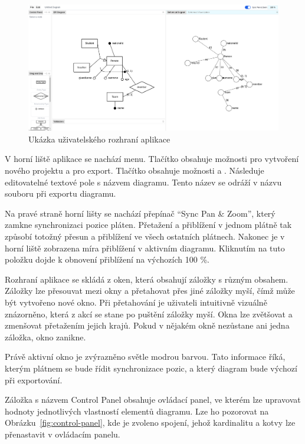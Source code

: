 \begin{figure}[!htb]
  \centering
  \includegraphics[width=\maxwidth{\textwidth}]{../img/app/user-interface.png}
  \caption{Ukázka uživatelského rozhraní aplikace}
  \label{fig:user-interface}
\end{figure}

V horní liště aplikace se nachází menu.
Tlačítko  obsahuje možnosti pro vytvoření nového projektu a pro export.
Tlačítko  obsahuje možnosti  a .
Následuje editovatelné textové pole s názvem diagramu.
Tento název se odráží v názvu souboru při exportu diagramu.

Na pravé straně horní lišty se nachází přepínač \enquote{Sync Pan \& Zoom}, který zamkne synchronizaci pozice pláten.
Přetažení a přiblížení v jednom plátně tak způsobí totožný přesun a přiblížení ve všech ostatních plátnech.
Nakonec je v horní liště zobrazena míra přiblížení v aktivním diagramu.
Kliknutím na tuto položku dojde k obnovení přiblížení na výchozích 100 \%.

Rozhraní aplikace se skládá z oken, která obsahují záložky s různým obsahem.
Záložky lze přesouvat mezi okny a přetahovat přes jiné záložky myší, čímž může být vytvořeno nové okno.
Při přetahování je uživateli intuitivně vizuálně znázorněno, která z akcí se stane po puštění záložky myší.
Okna lze zvětšovat a zmenšovat přetažením jejich krajů.
Pokud v nějakém okně nezůstane ani jedna záložka, okno zanikne.

Právě aktivní okno je zvýrazněno světle modrou barvou.
Tato informace říká, kterým plátnem se bude řídit synchronizace pozic, a který diagram bude výchozí při exportování.

Záložka s názvem Control Panel obsahuje ovládací panel, ve kterém lze upravovat hodnoty jednotlivých vlastností elementů diagramu.
Lze ho pozorovat na Obrázku~\ref{fig:control-panel}, kde je zvoleno spojení, jehož kardinalitu a kotvy lze přenastavit v ovládacím panelu.

